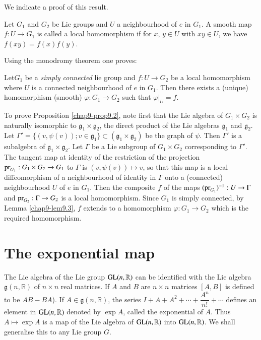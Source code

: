 We indicate a proof of this result.

\begin{defi*}
Let $G_{1}$ and $G_{2}$ be Lie groups and $U$ a neighbourhood of $e$ in $G_{1}$. A smooth map $f:U\to G_{1}$ is called a local homomorphism if for $x$, $y\in U$ with $xy\in U$, we have $f(xy)=f(x)f(y)$.
\end{defi*}

Using the monodromy theorem one proves:

\begin{lemma}\label{chap9-lem9.3}
Let\pageoriginale $G_{1}$ be a {\em simply connected} lie group and $f:U\to G_{2}$ be a local homomorphism where $U$ is a connected neighbourhood of $e$ in $G_{1}$. Then there exists a (unique) homomorphism (smooth) $\varphi:G_{1}\to G_{2}$ such that $\varphi|_{U}=f$.
\end{lemma}
 
To prove Proposition \ref{chap9-prop9.2}, note first that the Lie algebra of $G_{1}\times G_{2}$ is naturally isomorphic to $\mathfrak{g}_{1}\times \mathfrak{g}_{2}$, the direct product of the Lie algebras $\mathfrak{g}_{1}$ and $\mathfrak{g}_{2}$. Let $\Gamma'=\{(v,\psi(v)); v\in \mathfrak{g}_{1}\}\subset (\mathfrak{g}_{1}\times \mathfrak{g}_{2})$ be the graph of $\psi$. Then $\Gamma'$ is a subalgebra of $\mathfrak{g}_{1}\times \mathfrak{g}_{2}$. Let $\Gamma$ be a Lie subgroup of $G_{1}\times G_{2}$ corresponding to $\Gamma'$. The tangent map at identity of the restriction of the projection $\operatorname{pr}_{G_{1}}:G_{1}\times G_{2}\to G_{1}$ to $\Gamma$ is $(v,\psi(v))\mapsto v$, so that this map is a local diffeomorphism of a neighbourhood of identity in $\Gamma$ onto a (connected) neighbourhood $U$ of $e$ in $G_{1}$. Then the composite $f$ of the maps $(\operatorname{pr}_{G_{1}})^{-1}:U\to \Gamma$ and $\operatorname{pr}_{G_{2}}:\Gamma\to G_{2}$ is a local homomorphism. Since $G_{1}$ is simply connected, by Lemma \ref{chap9-lem9.3}, $f$ extends to a homomorphism $\varphi:G_{1}\to G_{2}$ which is the required homomorphism.

\section*{The exponential map}

The Lie algebra of the Lie group $\operatorname{GL}(n,\mathbb{R})$ can be identified with the Lie algebra $\mathfrak{g}(n,\mathbb{R})$ of $n\times n$ real matrices. If $A$ and $B$ are $n\times n$ matrices $[A,B]$ is defined to be $AB-BA$). If $A\in \mathfrak{g}(n,\mathbb{R})$, the series $I+A+A^{2}+\cdots+\dfrac{A^{n}}{n!}+\cdots$ defines an element in $\operatorname{GL}(n,\mathbb{R})$ denoted by $\exp A$, called the exponential of $A$. Thus $A\mapsto \exp A$ is a map of the Lie algebra of $\operatorname{GL}(n,\mathbb{R})$ into $\operatorname{GL}(n,\mathbb{R})$. We shall generalise this to any Lie group $G$.

